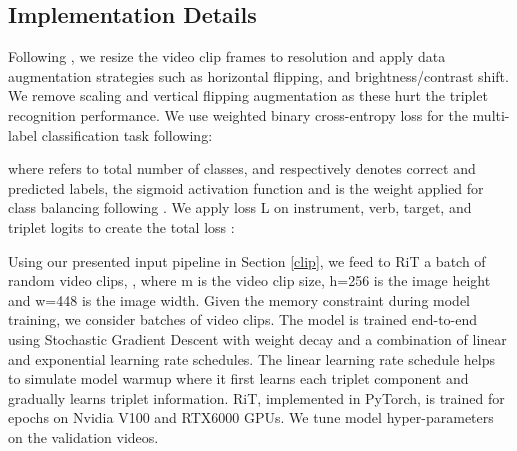 \documentclass{article}
\begin{document}
\subsection{Implementation Details}
Following \cite{ctsplits}, we resize the video clip frames to  resolution and apply data augmentation strategies such as horizontal flipping, and brightness/contrast shift. We remove scaling and vertical flipping augmentation as these hurt the triplet recognition performance. We use weighted binary cross-entropy loss for the multi-label classification task following: 



\noindent where  refers to total number of classes,  and  respectively denotes correct and predicted labels,  the sigmoid activation function and  is the weight applied for class balancing following \cite{lstmtool}. We apply loss L on instrument, verb, target, and triplet logits to create the total loss :

 

Using our presented input pipeline in Section \ref{clip}, we feed to RiT a batch of random video clips, , where m is the video clip size, h=256 is the image height and w=448 is the image width. Given the memory constraint during model training, we consider batches of  video clips. The model is trained end-to-end using Stochastic Gradient Descent with  weight decay and a combination of linear and exponential learning rate schedules. The linear learning rate schedule helps to simulate model warmup where it first learns each triplet component and gradually learns triplet information. RiT, implemented in PyTorch, is trained for  epochs on Nvidia V100 and RTX6000 GPUs. We tune model hyper-parameters on the  validation videos.

\begin{table}[ht]
\centering
    \setlength{\tabcolsep}{15pt}
\caption{\label{crossval} Triplet Recognition AP (\%) on CholecT45 dataset using official cross-validation splits.}
\end{table}
\end{document}
